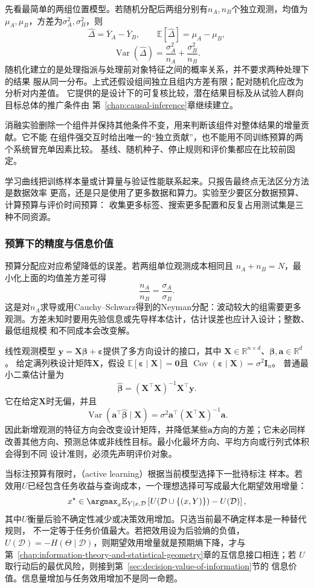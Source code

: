 先看最简单的两组位置模型。若随机分配后两组分别有\(n_A,n_B\)个独立观测，均值为
\(\mu_A,\mu_B\)，方差为\(\sigma_A^2,\sigma_B^2\)，则
\[
  \widehat\Delta=\overline Y_A-\overline Y_B,\qquad
  \mathbb{E}[\widehat\Delta]=\mu_A-\mu_B,
\]
\[
  \operatorname{Var}(\widehat\Delta)
  =\frac{\sigma_A^2}{n_A}+\frac{\sigma_B^2}{n_B}.
\]
随机化建立的是处理指派与处理前对象特征之间的概率关系，并不要求两种处理下的结果
服从同一分布。上式还假设组间独立且组内方差有限；配对随机化应改为分析对内差值。
它提供的是设计下的可复核比较，潜在结果目标及从试验人群向目标总体的推广条件由
第~\ref{chap:causal-inference}章继续建立。

消融实验删除一个组件并保持其他条件不变，用来判断该组件对整体结果的增量贡献。它不能
在组件强交互时给出唯一的“独立贡献”，也不能用不同训练预算的两个系统冒充单因素比较。
基线、随机种子、停止规则和评价集都应在比较前固定。

学习曲线把训练样本量或计算量与验证性能联系起来。只报告最终点无法区分方法是数据效率
更高，还是只是使用了更多数据和算力。实验至少要区分数据预算、计算预算与评价时间预算：
收集更多标签、搜索更多配置和反复占用测试集是三种不同资源。

\subsubsection{预算下的精度与信息价值}

预算分配应对应希望降低的误差。若两组单位观测成本相同且
\(n_A+n_B=N\)，最小化上面的均值差方差可得
\[
  \frac{n_A}{n_B}=\frac{\sigma_A}{\sigma_B}.
\]
这是对\(n_A\)求导或用Cauchy--Schwarz得到的Neyman分配：波动较大的组需要更多
观测。方差未知时要用先验信息或先导样本估计，估计误差也应计入设计；整数、最低组规模
和不同成本会改变解。

线性观测模型
\(\bm y=\bm X\bm\beta+\bm\varepsilon\)提供了多方向设计的接口，其中
\(\bm X\in\mathbb{R}^{n\times d}\)、\(\bm\beta,\bm a\in\mathbb{R}^d\)。
给定满列秩设计矩阵\(\bm X\)，假设
\(\mathbb{E}[\bm\varepsilon\mid\bm X]=\bm{0}\)且
\(\operatorname{Cov}(\bm\varepsilon\mid\bm X)=\sigma^2\bm I_n\)。
普通最小二乘估计量为
\[
  \widehat{\bm\beta}
  =(\bm X^\top\bm X)^{-1}\bm X^\top\bm y.
\]
它在给定\(\bm X\)时无偏，并且
\[
  \operatorname{Var}(\bm a^\top\widehat{\bm\beta}\mid\bm X)
  =\sigma^2\bm a^\top(\bm X^\top\bm X)^{-1}\bm a.
\]
因此新增观测的特征方向会改变设计矩阵，并降低某些\(\bm a\)方向的方差；它未必同样
改善其他方向、预测总体或非线性目标。最小化最坏方向、平均方向或行列式体积会得到不同
设计准则，必须先声明评价对象。

当标注预算有限时，（active learning）根据当前模型选择下一批待标注
样本。若效用\(U\)已经包含任务收益与查询成本，一个理想选择可写成最大化期望效用增量：
\[
  x^\star\in\argmax_x
  \mathbb{E}_{Y\mid x,\mathcal D}
  \left[
    U(\mathcal D\cup\{(x,Y)\})-U(\mathcal D)
  \right],
\]
其中\(U\)衡量后验不确定性减少或决策效用增加。只选当前最不确定样本是一种替代规则，
不一定等于任务价值最大。若把效用设为后验熵的负值，\(U(\mathcal D)=-H(\Theta\mid\mathcal D)\)，则期望效用增量就是预期熵下降，才与
第~\ref{chap:information-theory-and-statistical-geometry}章的互信息接口相连；若
\(U\)取行动后的最优风险，则接到第~\ref{sec:decision-value-of-information}节的
信息价值。信息量增加与任务效用增加不是同一命题。

